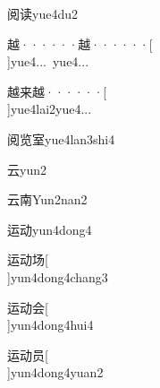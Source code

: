 \begin{verbete}[10;10]{阅读}{yue4du2}
\end{verbete}

\begin{verbete}[12;12]{越······越······}[\\]{yue4...\ yue4...}
\end{verbete}

\begin{verbete}[12;7;12]{越来越······}[\\]{yue4lai2yue4...}
\end{verbete}

\begin{verbete}[10;9;9]{阅览室}{yue4lan3shi4}
\end{verbete}

\begin{verbete}[4]{云}{yun2}
\end{verbete}

\begin{verbete}[4;9]{云南}{Yun2nan2}
\end{verbete}

\begin{verbete}[7;6]{运动}{yun4dong4}
\end{verbete}

\begin{verbete}[7;6;6]{运动场}[\\]{yun4dong4chang3}
\end{verbete}

\begin{verbete}[7;6;6]{运动会}[\\]{yun4dong4hui4}
\end{verbete}

\begin{verbete}[7;6;7]{运动员}[\\]{yun4dong4yuan2}
\end{verbete}

